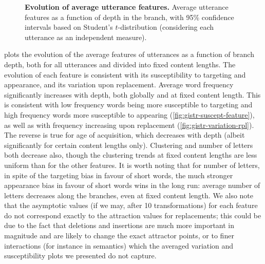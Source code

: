 \begin{figure}[!ht]
  \centering



  \caption[Evolution of average utterance features]{
  \textbf{Evolution of average utterance features.}
  Average utterance features as a function of depth in the branch, with 95\% confidence intervals based on Student's $t$-distribution (considering each utterance as an independent measure).
  }
  \label{fig:gistr-branchevo}
\end{figure}

 plots the evolution of the average features
of utterances as a function of branch depth, both for all utterances and
divided into fixed content lengths. The evolution of each feature is
consistent with its susceptibility to targeting and appearance, and its
variation upon replacement. Average word frequency significantly
increases with depth, both globally and at fixed content length. This is
consistent with low frequency words being more susceptible to targeting
and high frequency words more susceptible to appearing
(\cref{fig:gistr-suscept-feature}), as well as with frequency increasing
upon replacement (\cref{fig:gistr-variation-rpl}). The reverse is true
for age of acquisition, which decreases with depth (albeit significantly
for certain content lengths only). Clustering and number of letters both
decrease also, though the clustering trends at fixed content lengths are
less uniform than for the other features. It is worth noting that for
number of letters, in spite of the targeting bias in favour of short
words, the much stronger appearance bias in favour of short words wins
in the long run: average number of letters decreases along the branches,
even at fixed content length. We also note that the asymptotic values
(if we may, after 10 transformations) for each feature do not correspond
exactly to the attraction values for replacements; this could be due to
the fact that deletions and insertions are much more important in
magnitude and are likely to change the exact attractor points, or to
finer interactions (for instance in semantics) which the averaged
variation and susceptibility plots we presented do not capture.

